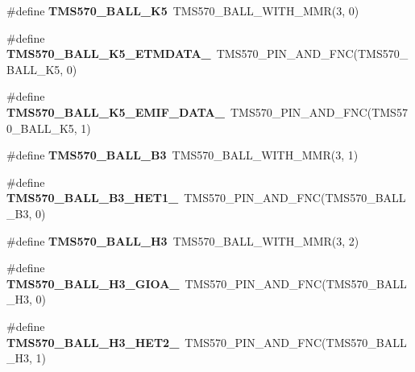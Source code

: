 \begin{DoxyCompactItemize}
\#define {\bfseries T\+M\+S570\+\_\+\+B\+A\+L\+L\+\_\+\+K5}~T\+M\+S570\+\_\+\+B\+A\+L\+L\+\_\+\+W\+I\+T\+H\+\_\+\+M\+MR(3, 0)
\item 
\mbox{\label{tms570ls3137zwt-pins_8h_a20f37516b2349e0aa06a2b7d159d04c3}} 
\#define {\bfseries T\+M\+S570\+\_\+\+B\+A\+L\+L\+\_\+\+K5\+\_\+\+E\+T\+M\+D\+A\+T\+A\+\_}~T\+M\+S570\+\_\+\+P\+I\+N\+\_\+\+A\+N\+D\+\_\+\+F\+NC(T\+M\+S570\+\_\+\+B\+A\+L\+L\+\_\+\+K5, 0)
\item 
\mbox{\label{tms570ls3137zwt-pins_8h_affd0bc2746101df209d57ed59404a733}} 
\#define {\bfseries T\+M\+S570\+\_\+\+B\+A\+L\+L\+\_\+\+K5\+\_\+\+E\+M\+I\+F\+\_\+\+D\+A\+T\+A\+\_}~T\+M\+S570\+\_\+\+P\+I\+N\+\_\+\+A\+N\+D\+\_\+\+F\+NC(T\+M\+S570\+\_\+\+B\+A\+L\+L\+\_\+\+K5, 1)
\item 
\mbox{\label{tms570ls3137zwt-pins_8h_a30f604e9a78b194cb6b69503a2330b1c}} 
\#define {\bfseries T\+M\+S570\+\_\+\+B\+A\+L\+L\+\_\+\+B3}~T\+M\+S570\+\_\+\+B\+A\+L\+L\+\_\+\+W\+I\+T\+H\+\_\+\+M\+MR(3, 1)
\item 
\mbox{\label{tms570ls3137zwt-pins_8h_a5f3ff8b36ea1a283dacb73dea0569b08}} 
\#define {\bfseries T\+M\+S570\+\_\+\+B\+A\+L\+L\+\_\+\+B3\+\_\+\+H\+E\+T1\+\_}~T\+M\+S570\+\_\+\+P\+I\+N\+\_\+\+A\+N\+D\+\_\+\+F\+NC(T\+M\+S570\+\_\+\+B\+A\+L\+L\+\_\+\+B3, 0)
\item 
\mbox{\label{tms570ls3137zwt-pins_8h_ac363b9371a1109af1c8cbb8f7bfe0bf4}} 
\#define {\bfseries T\+M\+S570\+\_\+\+B\+A\+L\+L\+\_\+\+H3}~T\+M\+S570\+\_\+\+B\+A\+L\+L\+\_\+\+W\+I\+T\+H\+\_\+\+M\+MR(3, 2)
\item 
\mbox{\label{tms570ls3137zwt-pins_8h_a73b831e2239507bc7b2409d611d90d99}} 
\#define {\bfseries T\+M\+S570\+\_\+\+B\+A\+L\+L\+\_\+\+H3\+\_\+\+G\+I\+O\+A\+\_}~T\+M\+S570\+\_\+\+P\+I\+N\+\_\+\+A\+N\+D\+\_\+\+F\+NC(T\+M\+S570\+\_\+\+B\+A\+L\+L\+\_\+\+H3, 0)
\item 
\mbox{\label{tms570ls3137zwt-pins_8h_a12053671201410f4171b5af03190499d}} 
\#define {\bfseries T\+M\+S570\+\_\+\+B\+A\+L\+L\+\_\+\+H3\+\_\+\+H\+E\+T2\+\_}~T\+M\+S570\+\_\+\+P\+I\+N\+\_\+\+A\+N\+D\+\_\+\+F\+NC(T\+M\+S570\+\_\+\+B\+A\+L\+L\+\_\+\+H3, 1)

\end{DoxyCompactItemize}

